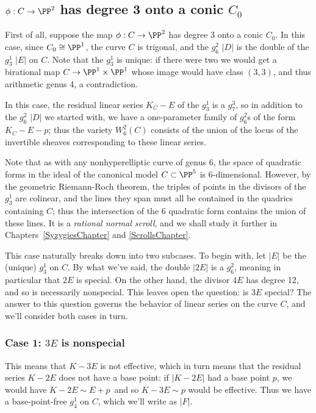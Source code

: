 \subsection{$\phi : C \to \PP^2$ has degree 3 onto a conic $C_0$}

First of all, suppose the map $\phi : C \to \PP^2$ has degree 3 onto a conic $C_0$. In this case, since $C_0 \cong \PP^1$, the curve $C$ is trigonal, and the $g^2_6$ $|D|$ is the double of the $g^1_3$ $|E|$ on $C$. Note that the $g^1_3$ is unique: if there were two we would get a birational map $C \to \PP^1\times \PP^1$ whose image would have class $(3,3)$, and thus
arithmetic genus 4, a contradiction.

In this case, the residual linear series $K_C - E$ of the $g^1_3$ is a $g^3_7$, so in addition to the $g^2_6$ $|D|$ we started with, we have a one-parameter family of $g^2_6$s of the form  $K_C - E - p$; thus the variety $W^2_6(C)$ consists of the union of the locus of the invertible sheaves corresponding to these linear series.

Note that as with any nonhyperelliptic curve of genus 6, the space of quadratic forms in the ideal of the canonical model $C \subset \PP^5$ is 6-dimensional. However, by the geometric Riemann-Roch theorem, the triples of points in the divisors of the $g^1_3$ are colinear,
and the lines they span must all be contained in the quadrics containing $C$; thus the intersection of the 6 quadratic
form contains the union of these lines. It is a \emph{rational normal scroll},
and we shall study it further in Chapters~\ref{SyzygiesChapter} and \ref{ScrollsChapter}.

This case naturally breaks down into two subcases. To begin with, let $|E|$ be the (unique) $g^1_3$ on $C$. By what we've said, the double $|2E|$ is a $g^2_6$, meaning in particular that $2E$ is special. On the other hand, the divisor $4E$ has degree 12, and so is necessarily nonspecial. This leaves open the question: is $3E$ special? The answer to this question governs the behavior of linear series on the curve $C$, and we'll consider both cases in turn.

\subsubsection{Case 1: $3E$ is nonspecial} This means that $K-3E$ is not effective, which in turn means that the residual series $K-2E$ does not have a base point: if $|K-2E|$ had a base point $p$, we would have $K - 2E \sim E + p$\, and so $K-3E \sim p$ would be effective. Thus we have a base-point-free $g^1_4$ on $C$, which we'll write as $|F|$.

